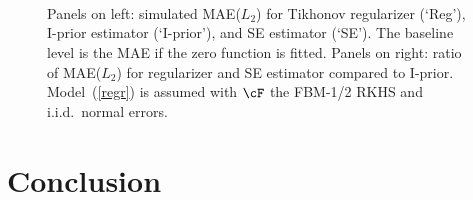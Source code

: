 \documentclass[preprint,12pt,authoryear]{elsarticle}
\begin{document}
\begin{figure}[tbp]
	\centering
	\\
	\\
	\\
	\caption{Panels on left: simulated MAE($L_2$) for Tikhonov regularizer (`Reg'), I-prior estimator (`I-prior'), and SE estimator (`SE'). The baseline level is the MAE if the zero function is fitted.  
		Panels on right: ratio of MAE($L_2$) for regularizer and SE estimator compared to I-prior.
		Model~(\ref{regr}) is assumed with $\cF$ the FBM-1/2 RKHS and i.i.d.\  normal errors. }
	\label{fig-sim3}
\end{figure}




\section{Conclusion}\label{sec-conc}
\end{document}
